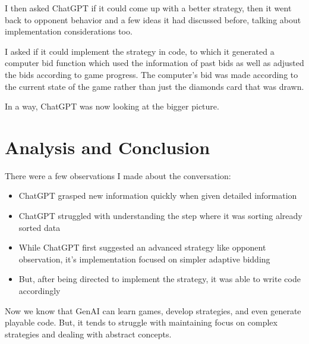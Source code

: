 \documentclass{article}
\begin{document}
I then asked ChatGPT if it could come up with a better strategy, then it went back to opponent behavior and a few ideas it had discussed before, talking about implementation considerations too.

I asked if it could implement the strategy in code, to which it generated a computer bid function which used the information of past bids as well as adjusted the bids according to game progress. The computer's bid was made according to the current state of the game rather than just the diamonds card that was drawn. 

In a way, ChatGPT was now looking at the bigger picture.

\section{Analysis and Conclusion}
There were a few observations I made about the conversation:
\begin{itemize}
    \item ChatGPT grasped new information quickly when given detailed information
    \item ChatGPT struggled with understanding the step where it was sorting already sorted data
    \item While ChatGPT first suggested an advanced strategy like opponent observation, it's implementation focused on simpler adaptive bidding
    \item But, after being directed to implement the strategy, it was able to write code accordingly
\end{itemize}

Now we know that GenAI can learn games, develop strategies, and even generate playable code. But, it tends to struggle with maintaining focus on complex strategies and dealing with abstract concepts.
\end{document}
